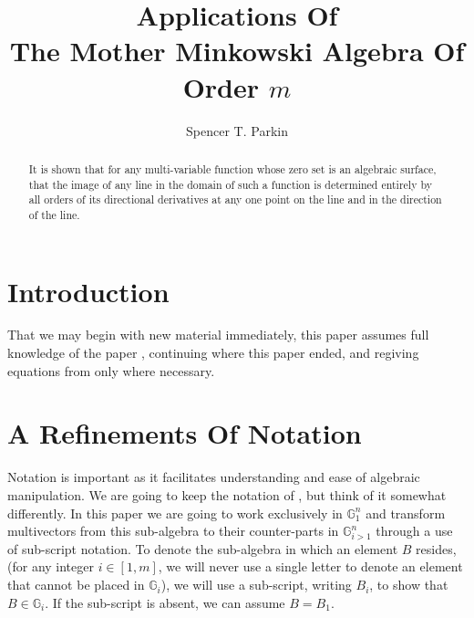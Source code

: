\documentclass{birkjour}
\theoremstyle{definition}
\theoremstyle{remark}
\numberwithin{equation}{section}
\newcommand{\G}{\mathbb{G}}
\begin{document}
%
%
%
%
%
%
%
%

\title{Applications Of\\The Mother Minkowski Algebra Of Order $m$}

\author{Spencer T. Parkin}
\address{102 W. 500 S., Salt Lake City, UT  84101}




\begin{abstract}
It is shown that for any multi-variable function whose zero set is an algebraic surface, that the image of any
line in the domain of such a function is determined entirely by all orders of its directional
derivatives at any one point on the line and in the direction of the line.
\end{abstract}

\maketitle

\section{Introduction}

That we may begin with new material immediately, this paper assumes full knowledge
of the paper \cite{}, continuing where this paper ended, and regiving equations from
\cite{} only where necessary.

\section{A Refinements Of Notation}

Notation is important as it facilitates understanding and ease of algebraic manipulation.
We are going to keep the notation of \cite{}, but think of it somewhat differently.
In this paper we are going to work exclusively in $\G_1^n$ and transform multivectors
from this sub-algebra to their counter-parts in $\G_{i>1}^n$ through a use of sub-script notation.
To denote the sub-algebra in which an element $B$ resides, (for any integer $i\in[1,m]$,
we will never use a single letter to denote an element that cannot be placed in $\G_i$),
we will use a sub-script, writing $B_i$, to show that $B\in\G_i$.  If the sub-script is
absent, we can assume $B=B_1$.
\end{document}
